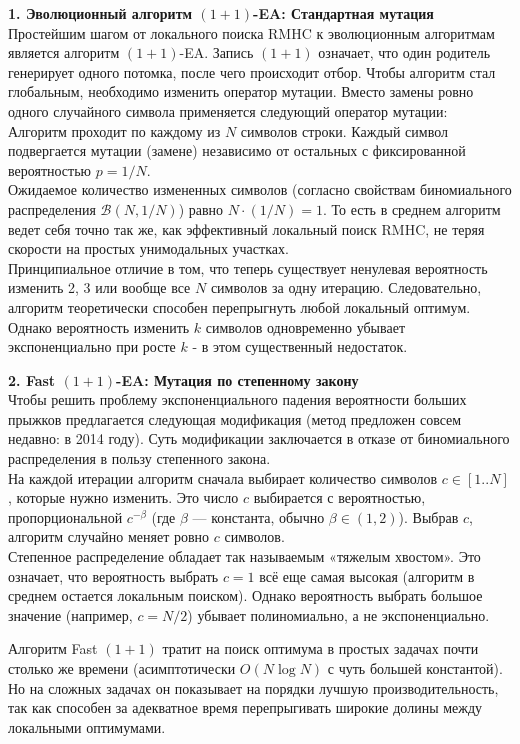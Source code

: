 \textbf{1. Эволюционный алгоритм $(1+1)$-EA: Стандартная мутация} \\
Простейшим шагом от локального поиска RMHC к эволюционным алгоритмам является алгоритм $(1+1)$-EA. Запись $(1+1)$ означает, что один родитель генерирует одного потомка, после чего происходит отбор. Чтобы алгоритм стал глобальным, необходимо изменить оператор мутации. Вместо замены ровно одного случайного символа применяется следующий оператор мутации: \\
Алгоритм проходит по каждому из $N$ символов строки. Каждый символ подвергается мутации (замене) независимо от остальных с фиксированной вероятностью $p = 1/N$. \\
Ожидаемое количество измененных символов (согласно свойствам биномиального распределения $\mathcal{B}(N, 1/N)$) равно $N \cdot (1/N) = 1$. То есть в среднем алгоритм ведет себя точно так же, как эффективный локальный поиск RMHC, не теряя скорости на простых унимодальных участках. \\
Принципиальное отличие в том, что теперь существует ненулевая вероятность изменить 2, 3 или вообще все $N$ символов за одну итерацию. Следовательно, алгоритм теоретически способен перепрыгнуть любой локальный оптимум. \\
Однако вероятность изменить $k$ символов одновременно убывает экспоненциально при росте $k$ - в этом существенный недостаток.

\textbf{2. Fast $(1+1)$-EA: Мутация по степенному закону} \\
Чтобы решить проблему экспоненциального падения вероятности больших прыжков предлагается следующая модификация (метод предложен совсем недавно: в 2014 году). Суть модификации заключается в отказе от биномиального распределения в пользу степенного закона. \\
На каждой итерации алгоритм сначала выбирает количество символов $c \in [1..N]$, которые нужно изменить. Это число $c$ выбирается с вероятностью, пропорциональной $c^{-\beta}$ (где $\beta$ — константа, обычно $\beta \in (1, 2)$). Выбрав $c$, алгоритм случайно меняет ровно $c$ символов. \\
Степенное распределение обладает так называемым «тяжелым хвостом». Это означает, что вероятность выбрать $c=1$ всё еще самая высокая (алгоритм в среднем остается локальным поиском). Однако вероятность выбрать большое значение (например, $c=N/2$) убывает полиномиально, а не экспоненциально. 

Алгоритм Fast $(1+1)$ тратит на поиск оптимума в простых задачах почти столько же времени (асимптотически $O(N \log N)$ с чуть большей константой). Но на сложных задачах он показывает на порядки лучшую производительность, так как способен за адекватное время перепрыгивать широкие долины между локальными оптимумами. \\

